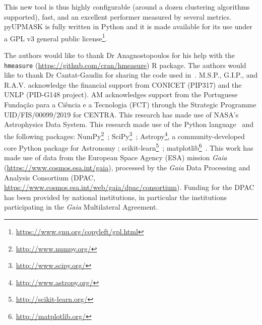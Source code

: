 \documentclass{aa}
\begin{document}
 This new tool is thus highly configurable (around a dozen clustering
 algorithms supported), fast, and an excellent performer measured by
 several metrics.
 pyUPMASK is fully written in Python and it is made available for its use
 under a GPL v3 general public
 license\footnote{\url{https://www.gnu.org/copyleft/gpl.html}}.






\begin{acknowledgements}
The authors would like to thank Dr Anagnostopoulos for his help with the
\texttt{hmeasure} (\url{https://github.com/cran/hmeasure}) R package.
%
The authors would like to thank Dr Cantat-Gaudin for sharing the code used
in~\cite{Cantat_2018}.
%
M.S.P., G.I.P., and R.A.V. acknowledge the financial support from CONICET 
(PIP317) and the UNLP (PID-G148 project).
%
AM acknowledges support from the Portuguese Fundação para a Ciência e a
Tecnologia (FCT) through the Strategic Programme UID/FIS/00099/2019 for CENTRA.
%
This research has made use of NASA's Astrophysics Data System.
%
This research made use of the Python language~\citep{vanRossum_1995}
and the following packages:
NumPy\footnote{\url{http://www.numpy.org/}}~\citep{vanDerWalt_2011};
SciPy\footnote{\url{http://www.scipy.org/}}~\citep{Jones_2001};
Astropy\footnote{\url{http://www.astropy.org/}}, a community-developed core Python
package for Astronomy \citep{astropy:2013,astropy:2018};
scikit-learn\footnote{\url{http://scikit-learn.org/}}~\citep{pedregosa_2011};
matplotlib\footnote{\url{http://matplotlib.org/}}~\citep{hunter_2007}.
%
This work has made use of data from the European Space Agency (ESA) mission
{\it Gaia} (\url{https://www.cosmos.esa.int/gaia}), processed by the {\it Gaia}
Data Processing and Analysis Consortium (DPAC,
\url{https://www.cosmos.esa.int/web/gaia/dpac/consortium}). Funding for the DPAC
has been provided by national institutions, in particular the institutions
participating in the {\it Gaia} Multilateral Agreement.
\end{acknowledgements}




\end{document}

